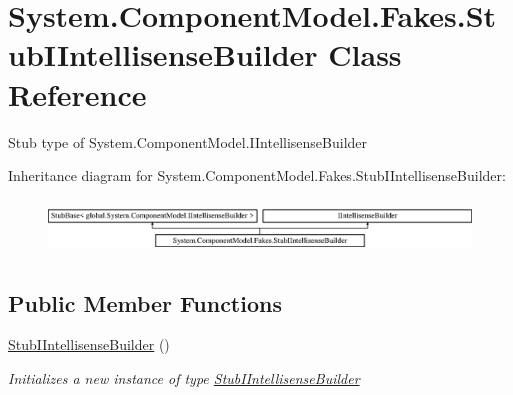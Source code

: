 \hypertarget{class_system_1_1_component_model_1_1_fakes_1_1_stub_i_intellisense_builder}{\section{System.\-Component\-Model.\-Fakes.\-Stub\-I\-Intellisense\-Builder Class Reference}
\label{class_system_1_1_component_model_1_1_fakes_1_1_stub_i_intellisense_builder}
}


Stub type of System.\-Component\-Model.\-I\-Intellisense\-Builder 


Inheritance diagram for System.\-Component\-Model.\-Fakes.\-Stub\-I\-Intellisense\-Builder\-:\begin{figure}[H]
\begin{center}
\leavevmode
\includegraphics[height=1.450777cm]{class_system_1_1_component_model_1_1_fakes_1_1_stub_i_intellisense_builder}
\end{center}
\end{figure}
\subsection*{Public Member Functions}
\begin{DoxyCompactItemize}
\item 
\hyperlink{class_system_1_1_component_model_1_1_fakes_1_1_stub_i_intellisense_builder_acaea3a96ab6b06f7c869b35192a73dee}{Stub\-I\-Intellisense\-Builder} ()
\begin{DoxyCompactList}\small\item\em Initializes a new instance of type \hyperlink{class_system_1_1_component_model_1_1_fakes_1_1_stub_i_intellisense_builder}{Stub\-I\-Intellisense\-Builder}\end{DoxyCompactList}\end{DoxyCompactItemize}
